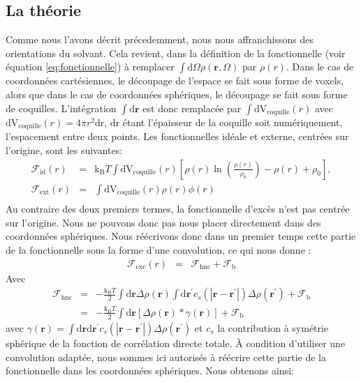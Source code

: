 \subsection{La théorie}
Comme nous l'avons décrit précedemment, nous nous affranchissons des orientations du solvant. Cela revient, dans la définition de la fonctionnelle (voir équation \ref{eq:fonctionnelle}) à remplacer $\int\mathrm{d}\Omega\rho(\boldsymbol{r}, \Omega)$ par $\rho(r)$. Dans le cas de coordonnées cartésiennes, le découpage de l'espace se fait sous forme de voxels, alors que dans le cas de coordonnées sphériques, le découpage se fait sous forme de coquilles. L'intégration $\int\mathrm{d}\boldsymbol{r}$ est donc remplacée par $\int\mathrm{dV}_{\mathrm{coquille}}(r)$ avec $\mathrm{dV}_{\mathrm{coquille}}(r)=4 \pi r^2 \mathrm{dr}$, $\mathrm{dr}$ étant l'épaisseur de la coquille soit numériquement, l'espacement entre deux points. Les fonctionnelles idéale et externe, centrées sur l'origine, sont les suivantes:
\begin{eqnarray}
\mathcal{F}_\mathrm{id}(r)&=&\mathrm{k_B}T\int\mathrm{dV}_{\mathrm{coquille}}(r) [ \rho\left(r \right)\ln\left(\frac{\rho\left(r \right)}{\rho_0}\right)-\rho\left(r \right)+\rho_0 ],\\
\mathcal{F}_\mathrm{ext}(r)&=&\int\mathrm{dV}_{\mathrm{coquille}}(r)\rho\left(r \right)\phi\left(r \right)\\
\end{eqnarray}
Au contraire des deux premiers termes, la fonctionnelle d'excès n'est pas centrée sur l'origine. Nous ne pouvons donc pas nous placer directement dans des coordonnées sphériques. Nous réécrivons donc dans un premier temps cette partie de la fonctionnelle sous la forme d'une convolution, ce qui nous donne :
\begin{eqnarray}
\mathcal{F}_\mathrm{exc}(r) &=& \mathcal{F}_\mathrm{hnc} + \mathcal{F}_\mathrm{b}
\end{eqnarray}
Avec
\begin{eqnarray}
\mathcal{F}_\mathrm{hnc}&=& -\frac{\mathrm{k_B}T}{2}\int\mathrm{d}\boldsymbol{r} \Delta\rho\left(\boldsymbol{r} \right)  \int\mathrm{d}\boldsymbol{r}^\prime c_s\left(\left|\boldsymbol{r}-\boldsymbol{r}^\prime\right| \right) \Delta\rho\left(\boldsymbol{r}^\prime \right) + \mathcal{F}_\mathrm{b}\\
						 &=& -\frac{\mathrm{k_B}T}{2}\int\mathrm{d}\boldsymbol{r} [ \Delta\rho\left(\boldsymbol{r} \right)  *\gamma(\boldsymbol{r}) ] + \mathcal{F}_\mathrm{b}
\end{eqnarray}
 avec $\gamma(\boldsymbol{r}) = \int\mathrm{d}\boldsymbol{r}\mathrm{d}\boldsymbol{r}^\prime c_s\left(\left|\boldsymbol{r}-\boldsymbol{r}^\prime\right| \right) \Delta\rho\left(\boldsymbol{r}^\prime  \right)$ et $c_s$ la contribution à symétrie sphérique de la fonction de corrélation directe totale. À condition d'utiliser une convolution adaptée, nous sommes ici autorisés à réécrire cette partie de la fonctionnelle dans les coordonnées sphériques. Nous obtenons ainsi:
